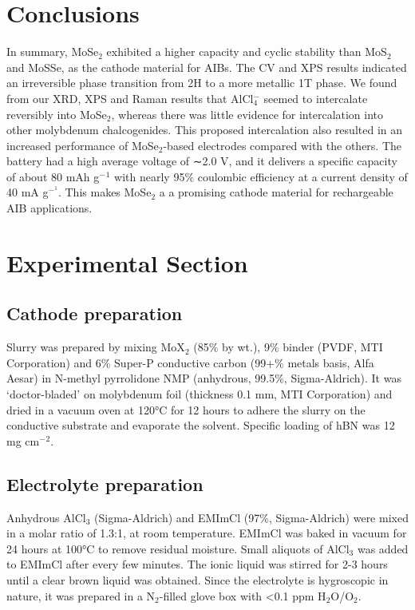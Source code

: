 \documentclass[num-refs]{wiley-article}
\begin{document}
\section{Conclusions}
In summary, MoSe$_2$ exhibited a higher capacity and cyclic stability than MoS$_2$ and MoSSe, as the cathode material for AIBs. The CV and XPS results indicated an irreversible phase transition from 2H to a more metallic 1T phase. We found from our XRD, XPS and Raman results that AlCl$_4^-$ seemed to intercalate reversibly into MoSe$_2$, whereas there was little evidence for intercalation into other molybdenum chalcogenides. This proposed intercalation also resulted in an increased performance of MoSe$_2$-based electrodes compared with the others. The battery had a high average voltage of ∼2.0 V, and it delivers a specific capacity of about 80 mAh g$^−{^1}$ with nearly 95$\%$ coulombic efficiency at a current density of 40 mA g$^{−^1}$. This makes MoSe$_2$ a a promising cathode material for rechargeable AIB applications.


\section{Experimental Section}
\subsection{Cathode preparation}
Slurry was prepared by mixing MoX$_2$ (85$\%$ by wt.), 9$\%$ binder (PVDF, MTI Corporation) and 6$\%$ Super-P conductive carbon (99+$\%$ metals basis, Alfa Aesar) in N-methyl pyrrolidone NMP (anhydrous, 99.5$\%$, Sigma-Aldrich). It was ‘doctor-bladed’ on molybdenum foil (thickness 0.1 mm, MTI Corporation) and dried in a vacuum oven at 120°C for 12 hours to adhere the slurry on the conductive substrate and evaporate the solvent. Specific loading of hBN was 12 mg cm$^-{^2}$. 
\subsection{Electrolyte preparation}
Anhydrous AlCl$_3$ (Sigma-Aldrich) and EMImCl (97$\%$, Sigma-Aldrich) were mixed in a molar ratio of 1.3:1, at room temperature. EMImCl was baked in vacuum for 24 hours at 100°C to remove residual moisture. Small aliquots of AlCl$_3$ was added to EMImCl after every few minutes. The ionic liquid was stirred for 2-3 hours until a clear brown liquid was obtained. Since the electrolyte is hygroscopic in nature, it was prepared in a N$_2$-filled glove box with <0.1 ppm H$_2$O/O$_2$. 
\end{document}
